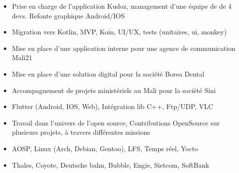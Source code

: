 \documentclass[10pt,a4paper]{altacv}
\begin{document}
\divider

\begin{itemize}
\item Prise en charge de l'application Kudoz, management d’une équipe de  de 4 devs. Refonte graphique Android/IOS
\item Migration vers Kotlin, MVP, Koin, UI/UX, tests (unitaires, ui, monkey)
\end{itemize}

\divider

\begin{itemize}
\item Mise en place d'une application interne pour une agence de communication Mali21
\item Mise en place d'une solution digital pour la société Borea Dental 
\item Accompagnement de projets ministériels au Mali pour la société Sini
\item Flutter (Android, IOS, Web), Intégration lib C++, Ftp/UDP, VLC
\end{itemize}


\divider

\begin{itemize}
\item Travail dans l'univers de l'open source, Contributions OpenSource sur plusieurs projets, à travers différentes missions 
\item AOSP, Linux (Arch, Debian, Gentoo), LFS, Temps réel, Yocto
\item Thales, Coyote, Deutsche bahn, Bubble, Engie, Sietcom, SoftBank
\end{itemize}



\clearpage

\end{document}

